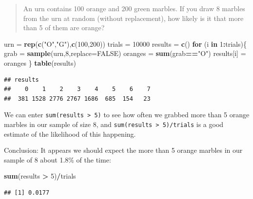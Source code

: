 \documentclass[
]{book}
\newenvironment{Shaded}{\begin{snugshade}}{\end{snugshade}}
\newcommand{\AttributeTok}[1]{\textcolor[rgb]{0.13,0.29,0.53}{#1}}
\newcommand{\ConstantTok}[1]{\textcolor[rgb]{0.56,0.35,0.01}{#1}}
\newcommand{\ControlFlowTok}[1]{\textcolor[rgb]{0.13,0.29,0.53}{\textbf{#1}}}
\newcommand{\DecValTok}[1]{\textcolor[rgb]{0.00,0.00,0.81}{#1}}
\newcommand{\FunctionTok}[1]{\textcolor[rgb]{0.13,0.29,0.53}{\textbf{#1}}}
\newcommand{\NormalTok}[1]{#1}
\newcommand{\OtherTok}[1]{\textcolor[rgb]{0.56,0.35,0.01}{#1}}
\newcommand{\SpecialCharTok}[1]{\textcolor[rgb]{0.81,0.36,0.00}{\textbf{#1}}}
\newcommand{\StringTok}[1]{\textcolor[rgb]{0.31,0.60,0.02}{#1}}
\theoremstyle{definition}
\theoremstyle{definition}
\theoremstyle{definition}
\theoremstyle{definition}
\theoremstyle{remark}
\begin{document}
\begin{quote}
An urn contains 100 orange and 200 green marbles. If you draw 8 marbles from the urn at random (without replacement), how likely is it that more than 5 of them are orange?
\end{quote}

\begin{Shaded}
\begin{Highlighting}[]
\NormalTok{urn }\OtherTok{=} \FunctionTok{rep}\NormalTok{(}\FunctionTok{c}\NormalTok{(}\StringTok{"O"}\NormalTok{,}\StringTok{"G"}\NormalTok{),}\FunctionTok{c}\NormalTok{(}\DecValTok{100}\NormalTok{,}\DecValTok{200}\NormalTok{))}
\NormalTok{trials }\OtherTok{=} \DecValTok{10000}
\NormalTok{results }\OtherTok{=} \FunctionTok{c}\NormalTok{()}
\ControlFlowTok{for}\NormalTok{ (i }\ControlFlowTok{in} \DecValTok{1}\SpecialCharTok{:}\NormalTok{trials)\{}
\NormalTok{  grab }\OtherTok{=} \FunctionTok{sample}\NormalTok{(urn,}\DecValTok{8}\NormalTok{,}\AttributeTok{replace=}\ConstantTok{FALSE}\NormalTok{)}
\NormalTok{  oranges }\OtherTok{=} \FunctionTok{sum}\NormalTok{(grab}\SpecialCharTok{==}\StringTok{"O"}\NormalTok{)}
\NormalTok{  results[i] }\OtherTok{=}\NormalTok{ oranges}
\NormalTok{\}}
\FunctionTok{table}\NormalTok{(results)}
\end{Highlighting}
\end{Shaded}

\begin{verbatim}
## results
##    0    1    2    3    4    5    6    7 
##  381 1528 2776 2767 1686  685  154   23
\end{verbatim}

We can enter \texttt{sum(results\ \textgreater{}\ 5)} to see how often we grabbed more than 5 orange marbles in our sample of size 8, and \texttt{sum(results\ \textgreater{}\ 5)/trials} is a good estimate of the likelihood of this happening.

Conclusion: It appears we should expect the more than 5 orange marbles in our sample of 8 about 1.8\% of the time:

\begin{Shaded}
\begin{Highlighting}[]
\FunctionTok{sum}\NormalTok{(results }\SpecialCharTok{\textgreater{}} \DecValTok{5}\NormalTok{)}\SpecialCharTok{/}\NormalTok{trials}
\end{Highlighting}
\end{Shaded}

\begin{verbatim}
## [1] 0.0177
\end{verbatim}
\end{document}

